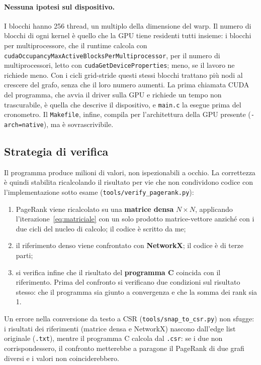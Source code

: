 \documentclass[11pt,a4paper]{article}
\newcommand{\stacco}{\par\medskip\noindent}
\begin{document}
\paragraph{Nessuna ipotesi sul dispositivo.}
I blocchi hanno 256 thread, un multiplo della dimensione del warp.
Il numero di blocchi di ogni kernel è quello che la GPU tiene residenti tutti
insieme: i blocchi per multiprocessore, che il runtime calcola con
\texttt{cudaOccupancyMaxActiveBlocksPerMultiprocessor}, per il numero di
multiprocessori, letto con \texttt{cudaGetDeviceProperties}; meno, se il
lavoro ne richiede meno. Con i cicli grid-stride questi stessi blocchi trattano
più nodi al crescere del grafo, senza che il loro numero aumenti. La prima
chiamata CUDA del programma,
che avvia il driver sulla GPU e richiede un tempo non trascurabile, è quella
che descrive il dispositivo, e \texttt{main.c} la esegue prima del cronometro.
Il \texttt{Makefile}, infine, compila per l'architettura della GPU presente
(\texttt{-arch=native}), ma è sovrascrivibile.

\subsection{Strategia di verifica}
\label{sec:verifica}
Il programma produce milioni di valori, non ispezionabili a
occhio. La correttezza è quindi stabilita ricalcolando il risultato per vie
che non condividono codice con l'implementazione sotto esame
(\texttt{tools/verify\_pagerank.py}):

\begin{enumerate}
  \item PageRank viene ricalcolato su una \textbf{matrice densa} $N \times N$,
    applicando l'iterazione~\eqref{eq:matriciale} con un solo prodotto
    matrice-vettore anziché con i due cicli del nucleo di calcolo; il codice è
    scritto da me;
  \item il riferimento denso viene confrontato con
    \textbf{NetworkX}; il codice è di terze parti;
  \item si verifica infine che il risultato del \textbf{programma C} 
    coincida con il riferimento.
    Prima del confronto si verificano due condizioni sul risultato stesso:
    che il programma sia giunto a convergenza e che la somma dei rank sia 1.
\end{enumerate}

\stacco
Un errore nella conversione da testo a CSR (\texttt{tools/snap\_to\_csr.py}) non sfugge:
i risultati dei riferimenti (matrice densa e NetworkX) nascono dall'edge list originale
(\texttt{.txt}), mentre il programma C calcola dal \texttt{.csr}: se i due non
corrispondessero, il confronto metterebbe a paragone il PageRank di due grafi
diversi e i valori non coinciderebbero.
\end{document}
